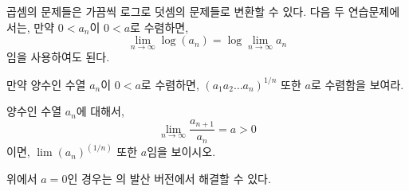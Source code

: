 곱셈의 문제들은 가끔씩 로그로 덧셈의 문제들로 변환할 수 있다.
다음 두 연습문제에서는, 만약 $0 < a_n$이 $0 < a$로 수렴하면,
\begin{equation*}
    \lim_{n \to \infty} \log(a_n) = \log \lim_{n \to \infty} a_n
\end{equation*}
임을 사용하여도 된다.

\begin{theorem}
    만약 양수인 수열 $a_n$이 $0 < a$로 수렴하면, $(a_1 a_2 \dots a_n)^{1/n}$ 또한 $a$로 수렴함을 보여라.
\end{theorem}
\begin{theorem}
    양수인 수열 $a_n$에 대해서, 
    \begin{equation*}
        \lim_{n \to \infty} \frac{a_{n + 1}}{a_n} = a > 0
    \end{equation*}
    이면, $\lim (a_n)^(1/n)$ 또한 $a$임을 보이시오.
\end{theorem}

\begin{remark}
    위에서 $a = 0$인 경우는 의 발산 버전에서 해결할 수 있다.
\end{remark}

